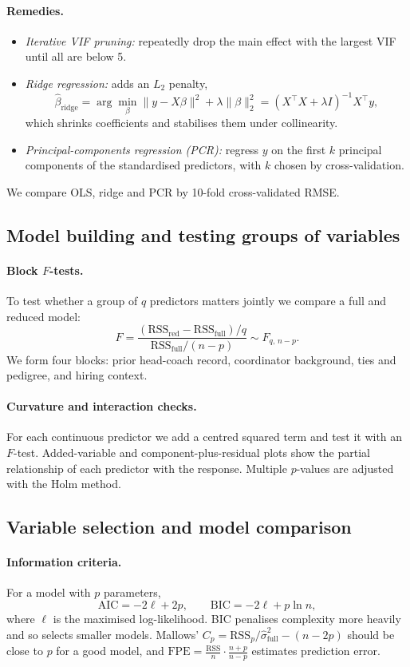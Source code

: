 \documentclass[11pt,a4paper]{article}
\begin{document}
\paragraph{Remedies.}
\begin{itemize}
  \item \emph{Iterative VIF pruning:} repeatedly drop the main effect with the largest VIF until all are below 5.
  \item \emph{Ridge regression:} adds an $L_2$ penalty,
  \[
  \hat\beta_{\text{ridge}}=\arg\min_\beta \|y-X\beta\|^2+\lambda\|\beta\|_2^2=(X^\top X+\lambda I)^{-1}X^\top y,
  \]
  which shrinks coefficients and stabilises them under collinearity.
  \item \emph{Principal-components regression (PCR):} regress $y$ on the first $k$ principal components of the standardised predictors, with $k$ chosen by cross-validation.
\end{itemize}
We compare OLS, ridge and PCR by 10-fold cross-validated RMSE.

\subsection{Model building and testing groups of variables}
\paragraph{Block $F$-tests.} To test whether a group of $q$ predictors matters jointly we compare a full and reduced model:
\[
F=\frac{(\mathrm{RSS}_{\text{red}}-\mathrm{RSS}_{\text{full}})/q}{\mathrm{RSS}_{\text{full}}/(n-p)}\sim F_{q,\,n-p}.
\]
We form four blocks: prior head-coach record, coordinator background, ties and pedigree, and hiring context.

\paragraph{Curvature and interaction checks.} For each continuous predictor we add a centred squared term and test it with an $F$-test. Added-variable and component-plus-residual plots show the partial relationship of each predictor with the response. Multiple $p$-values are adjusted with the Holm method.

\subsection{Variable selection and model comparison}
\paragraph{Information criteria.} For a model with $p$ parameters,
\[
\mathrm{AIC}=-2\ell+2p,\qquad \mathrm{BIC}=-2\ell+p\ln n,
\]
where $\ell$ is the maximised log-likelihood. BIC penalises complexity more heavily and so selects smaller models. Mallows' $C_p=\mathrm{RSS}_p/\hat\sigma^2_{\text{full}}-(n-2p)$ should be close to $p$ for a good model, and $\mathrm{FPE}=\frac{\mathrm{RSS}}{n}\cdot\frac{n+p}{n-p}$ estimates prediction error.
\end{document}
